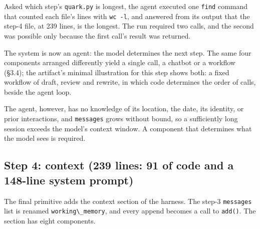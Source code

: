 Asked which step's \passthrough{\lstinline!quark.py!} is longest, the agent executed one \passthrough{\lstinline!find!} command that counted each file's lines with \passthrough{\lstinline!wc -l!}, and answered from its output that the step-4 file, at 239 lines, is the longest. The run required two calls, and the second was possible only because the first call's result was returned.

The system is now an agent: the model determines the next step. The same four components arranged differently yield a single call, a chatbot or a workflow (§3.4); the artifact's minimal illustration for this step shows both: a fixed workflow of draft, review and rewrite, in which code determines the order of calls, beside the agent loop.

The agent, however, has no knowledge of its location, the date, its identity, or prior interactions, and \passthrough{\lstinline!messages!} grows without bound, so a sufficiently long session exceeds the model's context window. A component that determines what the model sees is required.

\subsection{Step 4: context (239 lines: 91 of code and a 148-line system prompt)}

The final primitive adds the context section of the harness. The step-3 \passthrough{\lstinline!messages!} list is renamed \passthrough{\lstinline!working\_memory!}, and every append becomes a call to \passthrough{\lstinline!add()!}. The section has eight components.

